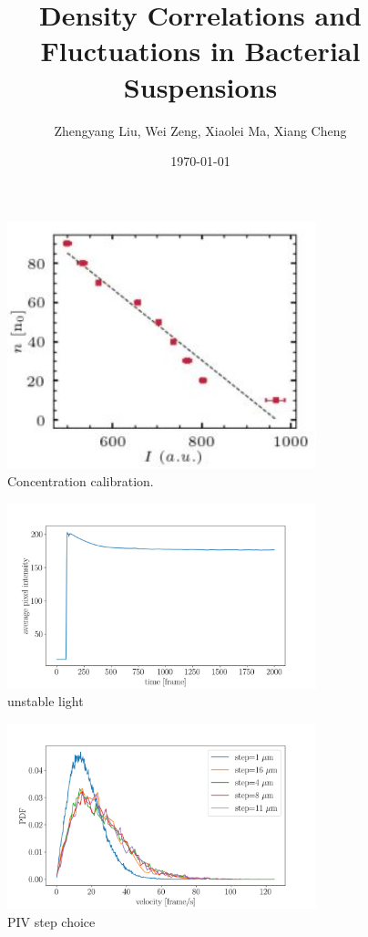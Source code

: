 \documentclass[11px]{article}
\title{Density Correlations and Fluctuations in Bacterial Suspensions}
\author{Zhengyang Liu, Wei Zeng, Xiaolei Ma, Xiang Cheng}
\date{\today}
\begin{document}
\maketitle

\begin{figure}[h]
\begin{center}
\includegraphics[width=0.8\textwidth]{fig-s1_conc-calibration.jpg}
\caption[]{Concentration calibration.}
\end{center}
\label{fig:s1}
\end{figure}

\begin{figure}[h]
\begin{center}
\includegraphics[width=0.8\textwidth]{fig-s2_unstable-light.png}
\caption[]{unstable light}
\end{center}
\label{fig:s2}
\end{figure}

\begin{figure}[h]
\begin{center}
\includegraphics[width=0.8\textwidth]{fig-s3_step-choice.png}
\caption[]{PIV step choice}
\end{center}
\label{fig:s3}
\end{figure}
\end{document}
